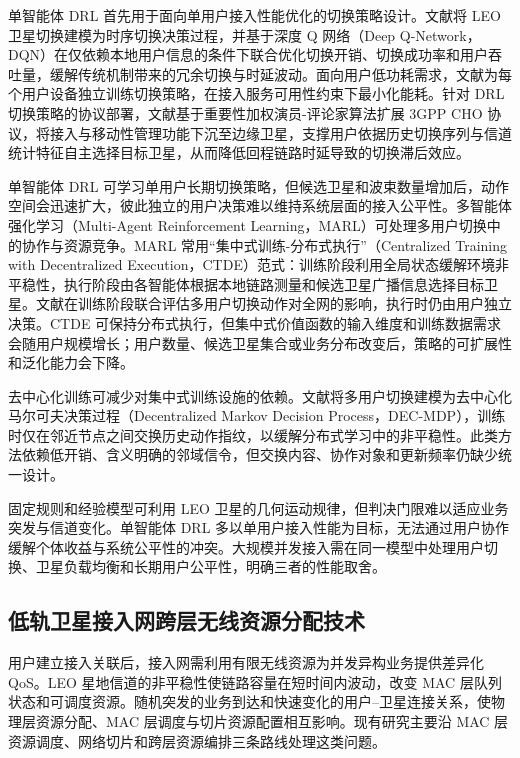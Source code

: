 单智能体 DRL 首先用于面向单用户接入性能优化的切换策略设计。文献\cite{liu-HO4LargeSat-VTC2022}将 LEO 卫星切换建模为时序切换决策过程，并基于深度 Q 网络（Deep Q-Network，DQN）在仅依赖本地用户信息的条件下联合优化切换开销、切换成功率和用户吞吐量，缓解传统机制带来的冗余切换与时延波动。面向用户低功耗需求，文献\cite{Nour-energySatHORL-Globecom23}为每个用户设备独立训练切换策略，在接入服务可用性约束下最小化能耗。针对 DRL 切换策略的协议部署，文献\cite{lee-HOProtocolLearning-TWC24}基于重要性加权演员-评论家算法扩展 3GPP CHO 协议，将接入与移动性管理功能下沉至边缘卫星，支撑用户依据历史切换序列与信道统计特征自主选择目标卫星，从而降低回程链路时延导致的切换滞后效应。

单智能体 DRL 可学习单用户长期切换策略，但候选卫星和波束数量增加后，动作空间会迅速扩大，彼此独立的用户决策难以维持系统层面的接入公平性。多智能体强化学习（Multi-Agent Reinforcement Learning，MARL）可处理多用户切换中的协作与资源竞争。MARL 常用“集中式训练-分布式执行”（Centralized Training with Decentralized Execution，CTDE）范式：训练阶段利用全局状态缓解环境非平稳性，执行阶段由各智能体根据本地链路测量和候选卫星广播信息选择目标卫星。文献\cite{he-HOMARL-GlobeCom20}在训练阶段联合评估多用户切换动作对全网的影响，执行时仍由用户独立决策。CTDE 可保持分布式执行，但集中式价值函数的输入维度和训练数据需求会随用户规模增长；用户数量、候选卫星集合或业务分布改变后，策略的可扩展性和泛化能力会下降。

去中心化训练可减少对集中式训练设施的依赖。文献\cite{yang-fingerprintMARL-TVT24}将多用户切换建模为去中心化马尔可夫决策过程（Decentralized Markov Decision Process，DEC-MDP），训练时仅在邻近节点之间交换历史动作指纹，以缓解分布式学习中的非平稳性。此类方法依赖低开销、含义明确的邻域信令，但交换内容、协作对象和更新频率仍缺少统一设计。

固定规则和经验模型可利用 LEO 卫星的几何运动规律，但判决门限难以适应业务突发与信道变化。单智能体 DRL 多以单用户接入性能为目标，无法通过用户协作缓解个体收益与系统公平性的冲突。大规模并发接入需在同一模型中处理用户切换、卫星负载均衡和长期用户公平性，明确三者的性能取舍。

\subsection{低轨卫星接入网跨层无线资源分配技术}

用户建立接入关联后，接入网需利用有限无线资源为并发异构业务提供差异化 QoS。LEO 星地信道的非平稳性使链路容量在短时间内波动，改变 MAC 层队列状态和可调度资源\cite{ma-resourceHighCapacity-TVT24,yuan-beamControl-TVT24}。随机突发的业务到达和快速变化的用户--卫星连接关系，使物理层资源分配、MAC 层调度与切片资源配置相互影响。现有研究主要沿 MAC 层资源调度、网络切片和跨层资源编排三条路线处理这类问题。

